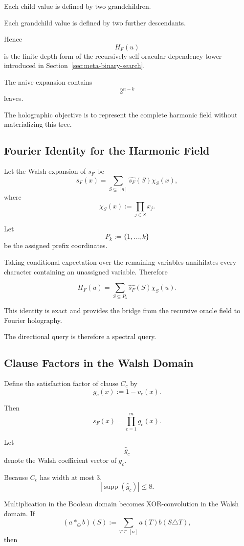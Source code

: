 \documentclass[11pt]{article}
\theoremstyle{plain}
\theoremstyle{definition}
\begin{document}
Each child value is defined by two grandchildren.

Each grandchild value is defined by two further descendants.

Hence
\[
    H_F(u)
\]
is the finite-depth form of the recursively self-oracular dependency tower
introduced in Section~\ref{sec:meta-binary-search}.

The naive expansion contains
\[
    2^{n-k}
\]
leaves.

The holographic objective is to represent the complete harmonic field without
materializing this tree.

\subsection{Fourier Identity for the Harmonic Field}

Let the Walsh expansion of \(s_F\) be~\cite{ODonnell2014}
\[
    s_F(x)
    =
    \sum_{S\subseteq[n]}
    \widehat{s_F}(S)\chi_S(x),
\]
where
\[
    \chi_S(x)
    :=
    \prod_{j\in S}x_j.
\]

Let
\[
    P_k:=\{1,\dots,k\}
\]
be the assigned prefix coordinates.

Taking conditional expectation over the remaining variables annihilates every
character containing an unassigned variable.  Therefore

\[
\boxed{
H_F(u)
=
\sum_{S\subseteq P_k}
\widehat{s_F}(S)\chi_S(u).
}
\]

This identity is exact and provides the bridge from the recursive oracle field
to Fourier holography.

The directional query is therefore a spectral query.

\subsection{Clause Factors in the Walsh Domain}

Define the satisfaction factor of clause \(C_c\) by
\[
    g_c(x)
    :=
    1-v_c(x).
\]

Then
\[
    s_F(x)
    =
    \prod_{c=1}^{m}g_c(x).
\]

Let
\[
    \widehat g_c
\]
denote the Walsh coefficient vector of \(g_c\).

Because \(C_c\) has width at most \(3\),
\[
    |\operatorname{supp}(\widehat g_c)|
    \leq 8.
\]

Multiplication in the Boolean domain becomes XOR-convolution in the Walsh
domain.  If
\[
    (a *_\oplus b)(S)
    :=
    \sum_{T\subseteq[n]}
    a(T)b(S\triangle T),
\]
then
\end{document}
